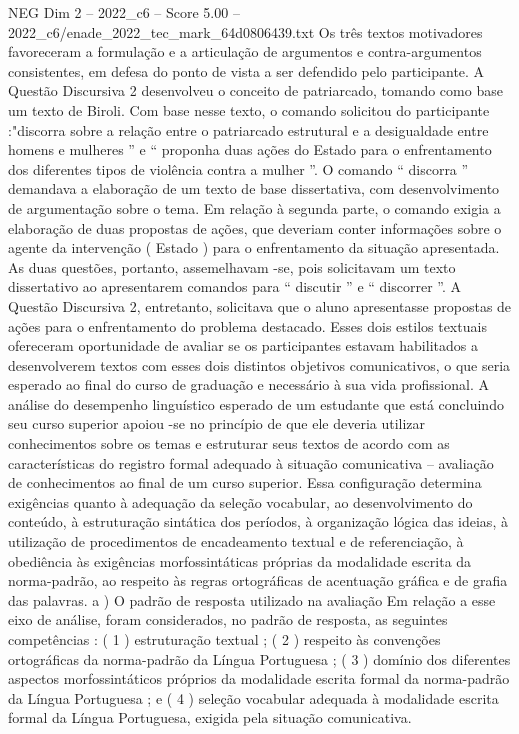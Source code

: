 \begin{textsample}{NEG Dim 2 – 2022\_c6 – Score 5.00 – 2022\_c6/enade\_2022\_tec\_mark\_64d0806439.txt}
Os três textos motivadores favoreceram a formulação e a articulação de argumentos e contra-argumentos consistentes, em defesa do ponto de vista a ser defendido pelo participante.
A Questão Discursiva 2 desenvolveu o conceito de patriarcado, tomando como base um texto de Biroli.
Com base nesse texto, o comando solicitou do participante :"discorra sobre a relação entre o patriarcado estrutural e a desigualdade entre homens e mulheres ” e “ proponha duas ações do Estado para o enfrentamento dos diferentes tipos de violência contra a mulher ”.
O comando “ discorra ” demandava a elaboração de um texto de base dissertativa, com desenvolvimento de argumentação sobre o tema.
Em relação à segunda parte, o comando exigia a elaboração de duas propostas de ações, que deveriam conter informações sobre o agente da intervenção ( Estado ) para o enfrentamento da situação apresentada.
As duas questões, portanto, assemelhavam -se, pois solicitavam um texto dissertativo ao apresentarem comandos para “ discutir ” e “ discorrer ”.
A Questão Discursiva 2, entretanto, solicitava que o aluno apresentasse propostas de ações para o enfrentamento do problema destacado.
Esses dois estilos textuais ofereceram oportunidade de avaliar se os participantes estavam habilitados a desenvolverem textos com esses dois distintos objetivos comunicativos, o que seria esperado ao final do curso de graduação e necessário à sua vida profissional.
A análise do desempenho linguístico esperado de um estudante que está concluindo seu curso superior apoiou -se no princípio de que ele deveria utilizar conhecimentos sobre os temas e estruturar seus textos de acordo com as características do registro formal adequado à situação comunicativa – avaliação de conhecimentos ao final de um curso superior.
Essa configuração determina exigências quanto à adequação da seleção vocabular, ao desenvolvimento do conteúdo, à estruturação sintática dos períodos, à organização lógica das ideias, à utilização de procedimentos de encadeamento textual e de referenciação, à obediência às exigências morfossintáticas próprias da modalidade escrita da norma-padrão, ao respeito às regras ortográficas de acentuação gráfica e de grafia das palavras. a ) O padrão de resposta utilizado na avaliação Em relação a esse eixo de análise, foram considerados, no padrão de resposta, as seguintes competências : ( 1 ) estruturação textual ; ( 2 ) respeito às convenções ortográficas da norma-padrão da Língua Portuguesa ; ( 3 ) domínio dos diferentes aspectos morfossintáticos próprios da modalidade escrita formal da norma-padrão da Língua Portuguesa ; e ( 4 ) seleção vocabular adequada à modalidade escrita formal da Língua Portuguesa, exigida pela situação comunicativa.

\end{textsample}
